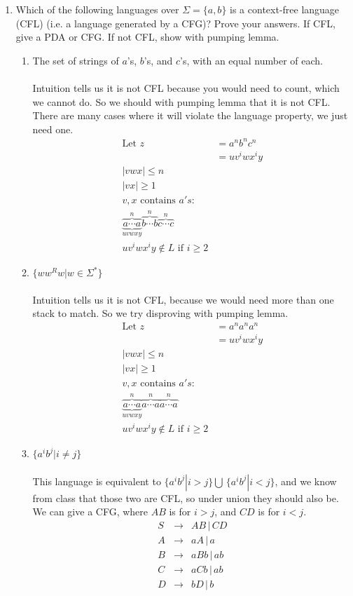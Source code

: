 \documentclass[10pt,a4paper,final]{article}
\begin{document}
\begin{enumerate}
\item %
Which of the following languages over $\Sigma = \{a,b\}$ is a context-free language (CFL)
(i.e. a language generated by a CFG)? Prove your answers.
If CFL, give a PDA or CFG. If not CFL, show with pumping lemma.
\begin{enumerate}
  \item %
  The set of strings of $a$'s, $b$'s, and $c$'s, with an equal number of each. \\
  \\
  Intuition tells us it is not CFL because you would need to count, which we cannot do.
  So we should with pumping lemma that it is not CFL.
  There are many cases where it will violate the language property, we just need one.
  \begin{align*}
    \mbox{Let } z &= a^n b^n c^n \\
    &= u v^i w x^i y \\
    |vwx| \leq n \\
    |vx| \geq 1 \\
    v,x \mbox{ contains } a's: \\
    \overbrace{\underbrace{a \cdots a}_{uvwxy}}^{n} \overbrace{b \cdots b}^{n} \overbrace{c \cdots c}^{n} \\
    u v^i w x^i y \notin L \mbox{ if } i \geq 2
  \end{align*}
  
  \item %
  $\{ww^Rw|w \in \Sigma^*\}$ \\
  \\
  Intuition tells us it is not CFL, because we would need more than one stack to match.
  So we try disproving with pumping lemma.
  \begin{align*}
    \mbox{Let } z &= a^n a^n a^n \\
    &= u v^i w x^i y \\
    |vwx| \leq n \\
    |vx| \geq 1 \\
    v,x \mbox{ contains } a's: \\
    \overbrace{\underbrace{a \cdots a}_{uvwxy}}^{n} \overbrace{a \cdots a}^{n} \overbrace{a \cdots a}^{n} \\
    u v^i w x^i y \notin L \mbox{ if } i \geq 2
  \end{align*}
  
  \item %
  $\{a^i b^j | i \neq j\}$ \\
  \\
  This language is equivalent to $\{a^i b^j | i > j\} \bigcup\, \{a^i b^j | i < j\}$, and
  we know from class that those two are CFL, so under union they should also be.
  We can give a CFG, where $AB$ is for $i > j$, and $CD$ is for $i < j$.
  \begin{align*}
    S &\rightarrow& AB \,|\, CD \\
    A &\rightarrow& aA \,|\, a \\
    B &\rightarrow& aBb \,|\, ab \\
    C &\rightarrow& aCb \,|\, ab \\
    D &\rightarrow& bD \,|\, b
  \end{align*}
  

\end{enumerate}
\end{enumerate}
\end{document}
